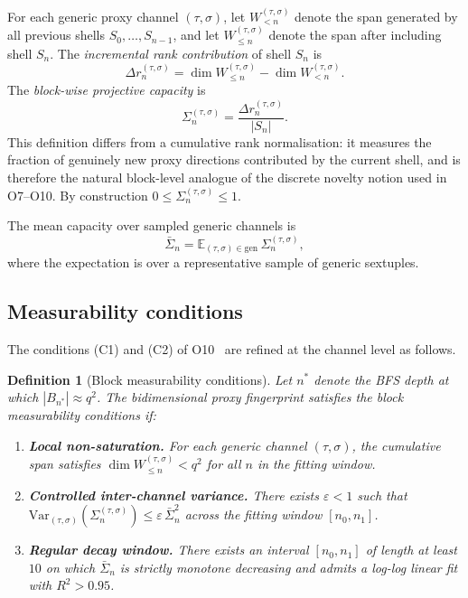 \documentclass[11pt,a4paper]{article}
\newtheorem{definition}[theorem]{Definition}
\newcommand{\Sigbar}{\bar{\Sigma}}
\newcommand{\Sigblock}{\Sigma_n^{(\tau,\sigma)}}
\begin{document}
    For each generic proxy channel $(\tau, \sigma)$, let $W_{<n}^{(\tau,\sigma)}$ denote the
    span generated by all previous shells $S_0, \dots, S_{n-1}$, and let
    $W_{\leq n}^{(\tau,\sigma)}$ denote the span after including shell $S_n$.
    The \emph{incremental rank contribution} of shell $S_n$ is
    \begin{equation}
      \label{eq:incremental-rank}
      \Delta r_n^{(\tau,\sigma)} =
      \dim W_{\leq n}^{(\tau,\sigma)} - \dim W_{<n}^{(\tau,\sigma)}.
    \end{equation}
    The \emph{block-wise projective capacity} is
    \begin{equation}
      \label{eq:block-capacity}
      \Sigblock = \frac{\Delta r_n^{(\tau,\sigma)}}{|S_n|}.
    \end{equation}
    This definition differs from a cumulative rank normalisation: it measures the fraction of
    genuinely new proxy directions contributed by the current shell, and is therefore the
    natural block-level analogue of the discrete novelty notion used in O7--O10.
    By construction $0 \leq \Sigblock \leq 1$.

    The mean capacity over sampled generic channels is
    \begin{equation}
      \label{eq:mean-capacity}
      \Sigbar_n = \mathbb{E}_{(\tau,\sigma) \in \mathrm{gen}}\,\Sigblock,
    \end{equation}
    where the expectation is over a representative sample of generic sextuples.

  \subsection{Measurability conditions}
    \label{sec:measurability}

    The conditions (C1) and (C2) of O10~\cite{Beau2026a14} are refined at the channel level as
    follows.

    \begin{definition}[Block measurability conditions]
      \label{def:measurability}
      Let $n^*$ denote the BFS depth at which $|B_{n^*}| \approx q^2$.
      The bidimensional proxy fingerprint satisfies the \emph{block measurability conditions} if:
      \begin{enumerate}
        \item[(B1)] \textbf{Local non-saturation.}
        For each generic channel $(\tau,\sigma)$, the cumulative span satisfies
        $\dim W_{\leq n}^{(\tau,\sigma)} < q^2$ for all $n$ in the fitting window.
        \item[(B2)] \textbf{Controlled inter-channel variance.}
        There exists $\varepsilon < 1$ such that
        $\mathrm{Var}_{(\tau,\sigma)}(\Sigblock) \leq \varepsilon\,\Sigbar_n^2$
        across the fitting window $[n_0, n_1]$.
        \item[(B3)] \textbf{Regular decay window.}
        There exists an interval $[n_0, n_1]$ of length at least $10$ on which
        $\Sigbar_n$ is strictly monotone decreasing and admits a log-log linear fit with $R^2 > 0.95$.
      \end{enumerate}
    \end{definition}
\end{document}
